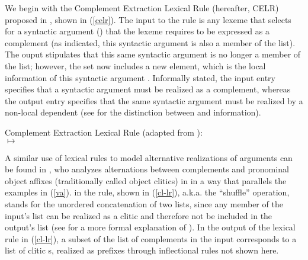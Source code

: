 \documentclass[output=paper
 	        ,biblatex
                ,babelshorthands
                ,newtxmath
                ,draftmode
                ,colorlinks, citecolor=brown
]{langscibook}
\begin{document}
We begin with the Complement Extraction Lexical Rule (hereafter, CELR) proposed in , shown in (\ref{celr}). The input to the rule is any lexeme that selects for a syntactic argument () that the lexeme requires to be expressed as a complement (as indicated, this syntactic argument is also a member of the  list). The ouput stipulates that this same syntactic argument is no longer a member of the  list; however, the  set now includes a new element, which is the local information of this syntactic argument . Informally stated, the input entry specifies that a syntactic argument must be realized as a complement, whereas the output entry specifies that the same syntactic argument must be realized by a non-local dependent (see \citealt[Chapter~4]{PollardandSag1994} for the distinction between  and  information).

\ea
Complement Extraction Lexical Rule (adapted from \citealt[]{PollardandSag1994}):\\
\label{celr}
	$\mapsto$
\z


A similar use of lexical rules to model alternative realizations of arguments can be found in , who analyzes alternations between complements and pronominal object affixes (traditionally called object clitics) in  in a way that parallels the  examples in (\ref{va}). \shuffle\is{$\bigcirc$} in the rule, shown in (\ref{cl-lr}), a.k.a. the ``shuffle'' operation, stands for the unordered concatenation of two lists, since any member of the input's  list can be realized as a clitic and therefore not be included in the output's  list (see \crossrefchaptert[\pageref{rel-shuffle}]{order} for a more formal explanation of \shuffle). In the output of the lexical rule in (\ref{cl-lr}), a subset of the list of complements in the input  corresponds to a list of clitic s, realized as prefixes through inflectional rules not shown here. 
\end{document}
